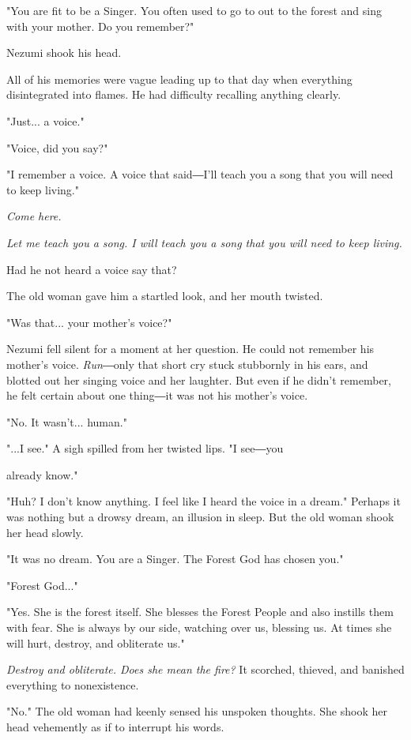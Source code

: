 "You are fit to be a Singer. You often used to go to out to the forest
and sing with your mother. Do you remember?"

Nezumi shook his head.

All of his memories were vague leading up to that day when everything
disintegrated into flames. He had difficulty recalling anything clearly.

"Just... a voice."

"Voice, did you say?"

"I remember a voice. A voice that said―I'll teach you a song that you
will need to keep living."

\emph{Come here.}

\emph{Let me teach you a song. I will teach you a song that you will need to
keep living.}

Had he not heard a voice say that?

The old woman gave him a startled look, and her mouth twisted.

"Was that... your mother's voice?"

Nezumi fell silent for a moment at her question. He could not remember
his mother's voice. \emph{Run}―only that short cry stuck stubbornly in his
ears, and blotted out her singing voice and her laughter. But even if he
didn't remember, he felt certain about one thing―it was not his mother's
voice.

"No. It wasn't... human."

"...I see." A sigh spilled from her twisted lips. "I see―you~

already know."

"Huh? I don't know anything. I feel like I heard the voice in a dream."
Perhaps it was nothing but a drowsy dream, an illusion in sleep. But the
old woman shook her head slowly.

"It was no dream. You are a Singer. The Forest God has chosen you."

"Forest God..."

"Yes. She is the forest itself. She blesses the Forest People and also
instills them with fear. She is always by our side, watching over us,
blessing us. At times she will hurt, destroy, and obliterate us."

\emph{Destroy and obliterate. Does she mean the fire?} It scorched, thieved,
and banished everything to nonexistence.

"No." The old woman had keenly sensed his unspoken thoughts. She shook
her head vehemently as if to interrupt his words.

